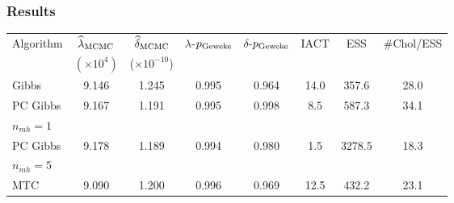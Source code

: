 \documentclass[]{beamer}
\renewcommand{\hat}{\widehat}
\begin{document}
\begin{frame}[t]
  \frametitle{Results}

\vspace{3em}

{\tiny
  \begin{tabular}{l|ccccccc}
    \hline
    Algorithm           & $\hat{\lambda}_{\rm MCMC}$& $\hat{\delta}_{\rm MCMC}$& $\lambda$-$p_{\rm Geweke}$&$\delta$-$p_{\rm Geweke}$& IACT & ESS    & \#Chol/ESS \\
     & $(\times 10^{4})$ & ($\times 10^{-10}$) & & \\
    \hline
                  Gibbs &                 9.146 &               1.245  &                     0.995 &                    0.964& 14.0 &  357.6 &      \alert{28.0} \\
              PC Gibbs  &                 9.167 &               1.191  &                     0.995 &                    0.998&  8.5 &  587.3 &      \alert{34.1} \\
\hspace{.2in}$n_{mh}=1$ & & & & & & & \\
               PC Gibbs &                 9.178 &               1.189  &                     0.994 &                    0.980&  1.5 & 3278.5 &      \alert{18.3} \\
\hspace{.2in} $n_{mh}=5$ & & & & & & & \\
		    MTC &                 9.090 &               1.200  &                     0.996 &                    0.969& 12.5 &  432.2 &      \alert{23.1} \\
    \hline
  \end{tabular}
}

\end{frame}
\end{document}
